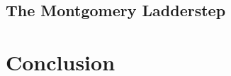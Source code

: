 \documentclass{llncs}
\begin{document}
\vspace{-.5em}
\subsection{The Montgomery Ladderstep}
\vspace{-.5em}
\label{subsection:evaluation:ladder-step}


\vspace{-.5em}
\section{Conclusion}
\vspace{-.5em}
\label{section:conclusion}


\newpage



\end{document}
